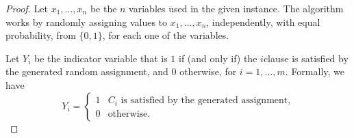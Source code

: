 \begin{proof}
    Let $x_1,\ldots, x_n$ be the $n$ variables used in the given instance.
    The algorithm works by randomly assigning values to
    $x_1,\ldots, x_n$, independently, with equal probability, from
    $\{0, 1\}$, for each one of the variables.

    Let $Y_{i}$ be the indicator variable that is $1$ if (and only if)
    the $i$\th clause is satisfied by the generated random assignment,
    and $0$ otherwise, for $i=1,\ldots, m$. Formally, we have
    \begin{equation*}
        Y_{i} = \begin{cases}
            1 & C_{i}\text{ is satisfied by the generated assignment,}\\
            0 & \text{otherwise.}
        \end{cases}
    \end{equation*}
      

\end{proof}
